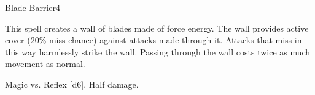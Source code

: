 \begin{spellsection}{Blade Barrier}{4}
    \begin{spellheader}
    \end{spellheader}
    \begin{spellcontent}
        \begin{spelltargetinginfo}
        \end{spelltargetinginfo}
        \begin{spelleffects}
            \spelleffect This spell creates a wall of blades made of force energy. The wall provides active cover (20\% miss chance) against attacks made through it. Attacks that miss in this way harmlessly strike the wall. Passing through the wall costs twice as much movement as normal.
            \spelldur \durshort \dismissable
        \end{spelleffects}
    \end{spellcontent}
    \begin{spellsubcontent}
        \begin{spelltargetinginfo}
        \end{spelltargetinginfo}
        \begin{spelleffects}
            \begin{spellattack}{Magic vs. Reflex}
                \spellsuccess {}[d6].
                \spellfailure Half damage.
            \end{spellattack}
        \end{spelleffects}
    \end{spellsubcontent}
    \begin{spellfooter}
        \miscastexplode
    \end{spellfooter}
\end{spellsection}

